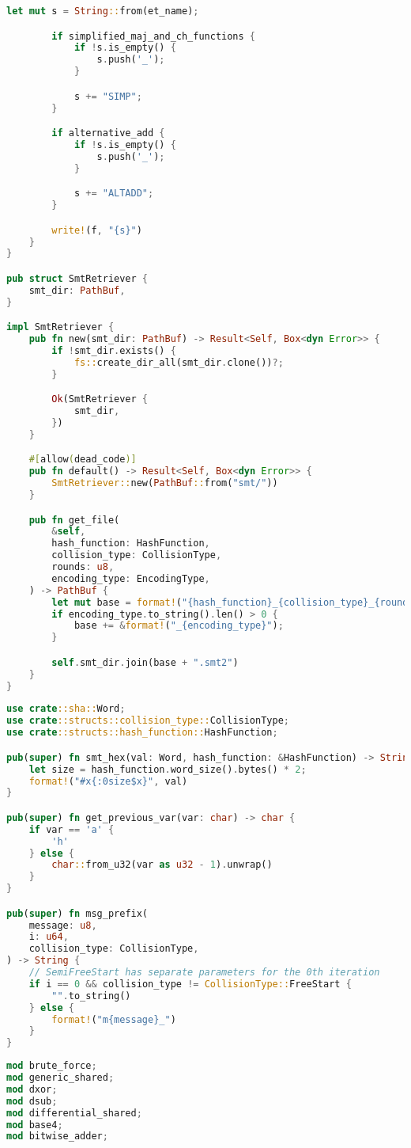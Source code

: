 \begin{lstlisting}[language=rust, caption={smt\_lib/smt\_retriever.rs}]
		let mut s = String::from(et_name);

		if simplified_maj_and_ch_functions {
			if !s.is_empty() {
				s.push('_');
			}

			s += "SIMP";
		}

		if alternative_add {
			if !s.is_empty() {
				s.push('_');
			}

			s += "ALTADD";
		}

		write!(f, "{s}")
	}
}

pub struct SmtRetriever {
	smt_dir: PathBuf,
}

impl SmtRetriever {
	pub fn new(smt_dir: PathBuf) -> Result<Self, Box<dyn Error>> {
		if !smt_dir.exists() {
			fs::create_dir_all(smt_dir.clone())?;
		}

		Ok(SmtRetriever {
			smt_dir,
		})
	}

	#[allow(dead_code)]
	pub fn default() -> Result<Self, Box<dyn Error>> {
		SmtRetriever::new(PathBuf::from("smt/"))
	}

	pub fn get_file(
		&self,
		hash_function: HashFunction,
		collision_type: CollisionType,
		rounds: u8,
		encoding_type: EncodingType,
	) -> PathBuf {
		let mut base = format!("{hash_function}_{collision_type}_{rounds}");
		if encoding_type.to_string().len() > 0 {
			base += &format!("_{encoding_type}");
		}

		self.smt_dir.join(base + ".smt2")
	}
}
\end{lstlisting}

\begin{lstlisting}[language=rust, caption={smt\_lib/utilities.rs}]
use crate::sha::Word;
use crate::structs::collision_type::CollisionType;
use crate::structs::hash_function::HashFunction;

pub(super) fn smt_hex(val: Word, hash_function: &HashFunction) -> String {
	let size = hash_function.word_size().bytes() * 2;
	format!("#x{:0size$x}", val)
}

pub(super) fn get_previous_var(var: char) -> char {
	if var == 'a' {
		'h'
	} else {
		char::from_u32(var as u32 - 1).unwrap()
	}
}

pub(super) fn msg_prefix(
	message: u8,
	i: u64,
	collision_type: CollisionType,
) -> String {
	// SemiFreeStart has separate parameters for the 0th iteration
	if i == 0 && collision_type != CollisionType::FreeStart {
		"".to_string()
	} else {
		format!("m{message}_")
	}
}
\end{lstlisting}

\begin{lstlisting}[language=rust, caption={smt\_lib/encodings/mod.rs}]
mod brute_force;
mod generic_shared;
mod dxor;
mod dsub;
mod differential_shared;
mod base4;
mod bitwise_adder;
\end{lstlisting}

